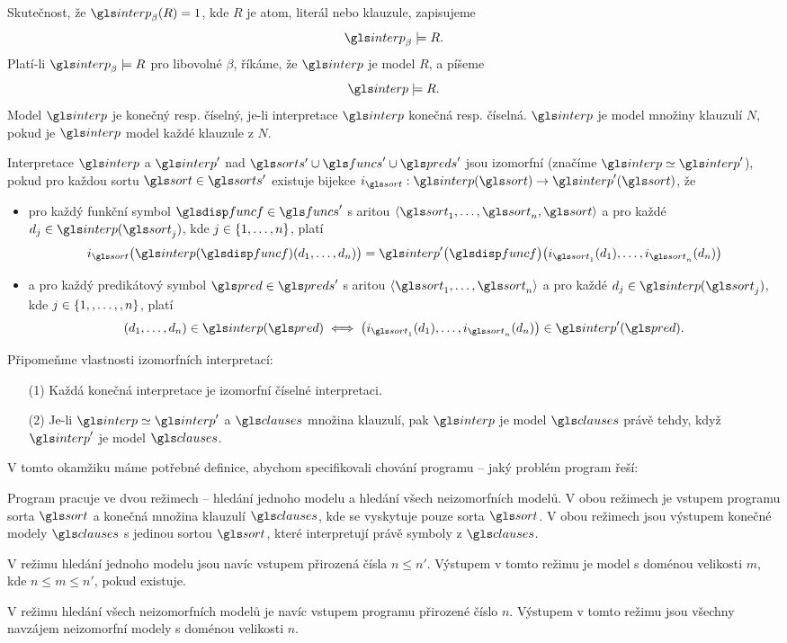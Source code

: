 Skutečnost, že $\interp_\beta(R) = 1$, kde $R$ je atom, literál nebo klauzule,
zapisujeme
\[
\interp_\beta \models R.
\]
Platí-li $\interp_\beta \models R$ pro libovolné $\beta$, říkáme,
že $\interp$ je model $R$, a píšeme
\[
\interp \models R.
\]
Model $\interp$ je konečný resp. číselný, je-li interpretace
$\interp$ konečná resp. číselná.
$\interp$ je model množiny klauzulí $N$,
pokud je $\interp$ model každé klauzule z $N$.

Interpretace $\interp$ a $\interp'$ nad
$\sorts' \cup \funcs' \cup \preds'$ jsou izomorfní
(značíme $\interp \simeq \interp'$), pokud pro každou
sortu $\sort \in \sorts'$ existuje bijekce
$i_\sort: \interp(\sort) \to \interp'(\sort)$, že
\begin{itemize}
\item pro každý funkční symbol $\func \in \funcs'$ s aritou
  $\langle \sort_1 \comdots \sort_n, \sort \rangle$
  a pro každé $d_j \in \interp(\sort_j)$,
  kde $j \in \{ 1 , \ldots, n \}$, platí
  \[
     i_\sort\bigl(\interp(\func)(d_1 \comdots d_n)\bigr) =
     \interp'\bigl(\func\bigr)\bigl(i_{\sort_1}(d_1) \comdots
       i_{\sort_n}(d_n)\bigr)
  \]
\item a pro každý predikátový symbol $\pred \in \preds'$ s aritou
  $\langle \sort_1 \comdots \sort_n \rangle$
  a pro každé $d_j \in \interp(\sort_j)$,
  kde $j \in \{ 1, , \ldots,, n \}$, platí
  \[
     (d_1 \comdots d_n) \in \interp(\pred) \iff
     \bigl(i_{\sort_1}(d_1) \comdots i_{\sort_n}(d_n)\bigr) \in \interp'(\pred).
  \]
\end{itemize}

Připomeňme vlastnosti izomorfních interpretací:
\begin{itemize}
\item[(1)] Každá konečná interpretace je izomorfní číselné interpretaci.
\item[(2)] Je-li $\interp \simeq \interp'$ a $\clauses$ množina klauzulí,
  pak $\interp$ je model $\clauses$ právě tehdy,
  když $\interp'$ je model $\clauses$.
\end{itemize}

V tomto okamžiku máme potřebné definice,
abychom specifikovali chování programu -- jaký problém program řeší:

\begin{defn}
Program pracuje ve dvou režimech -- hledání jednoho modelu a
hledání všech neizomorfních modelů. V obou režimech je vstupem programu
sorta $\sort$ a konečná množina klauzulí $\clauses$,
kde se vyskytuje pouze sorta $\sort$.
V obou režimech jsou výstupem konečné modely $\clauses$
s jedinou sortou $\sort$, které
interpretují právě symboly z $\clauses$.

V režimu hledání jednoho modelu jsou navíc vstupem přirozená čísla
$n \leq n'$. Výstupem v tomto režimu je model
s doménou velikosti $m$, kde $n \leq m \leq n'$, pokud existuje.

V režimu hledání všech neizomorfních modelů je
navíc vstupem programu přirozené číslo $n$.
Výstupem v tomto režimu jsou všechny navzájem
neizomorfní modely s doménou velikosti $n$.
\end{defn}

